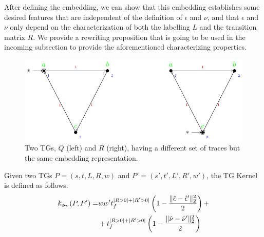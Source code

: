 After defining the embedding, we can show that this embedding establishes some desired features that are independent of the definition of $\epsilon$ and $\nu$, and that $\epsilon$ and $\nu$ only depend on the characterization of both the labelling $L$ and the transition matrix $R$. We provide a rewriting proposition that is going to be used in the incoming subsection to provide the aforementioned characterizing properties.

\begin{figure}
	\centering
	\includegraphics[scale=.8]{images/counterexample.pdf}
	\caption{Two TGs, $Q$ (left) and $R$ (right), having a different set of traces but the same embedding representation.}\label{fig:counterexample}
\end{figure}
\begin{proposition}\label{lem:rewritinglemma}
Given two TGs $P=(s,t,L,R,w)$ and $P'=(s',t',L',R',w')$, the TG Kernel is defined as follows:
$$\begin{aligned}
k_{\phi_{\mathcal{P}}}(P,P')=&ww't_f^{|R>0|+|R'>0|}\left(1-\frac{\|\hat{\epsilon}-\hat{\epsilon}'\|_{2}^2}{2}\right)+\\
	&+t_f^{|R>0|+|R'>0|}\left(1-\frac{\|\hat{\nu}-\hat{\nu}'\|_{2}^2}{2}\right)\\
\end{aligned}$$
\end{proposition}
